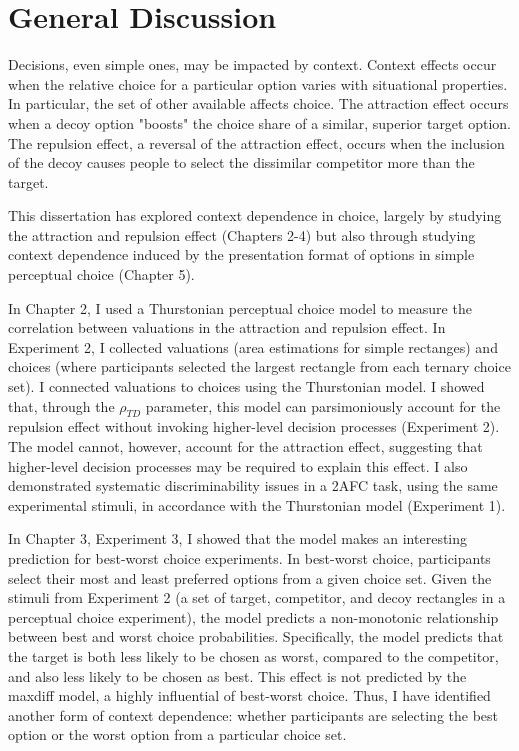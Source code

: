 \section{General Discussion}

Decisions, even simple ones, may be impacted by context. Context effects occur when the relative choice for a particular option varies with situational properties. In particular, the set of other available affects choice. The attraction effect occurs when a decoy option "boosts" the choice share of a similar, superior target option. The repulsion effect, a reversal of the attraction effect, occurs when the inclusion of the decoy causes people to select the dissimilar competitor more than the target. 

This dissertation has explored context dependence in choice, largely by studying the attraction and repulsion effect (Chapters 2-4) but also through studying context dependence induced by the presentation format of options in simple perceptual choice (Chapter 5).

In Chapter 2, I used a Thurstonian perceptual choice model to measure the correlation between valuations in the attraction and repulsion effect. In Experiment 2, I collected valuations (area estimations for simple rectanges) and choices (where participants selected the largest rectangle from each ternary choice set). I connected valuations to choices using the Thurstonian model. I showed that, through the $\rho_{TD}$ parameter, this model can parsimoniously account for the repulsion effect without invoking higher-level decision processes (Experiment 2). The model cannot, however, account for the attraction effect, suggesting that higher-level decision processes may be required to explain this effect. I also demonstrated systematic discriminability issues in a 2AFC task, using the same experimental stimuli, in accordance with the Thurstonian model (Experiment 1).

In Chapter 3, Experiment 3, I showed that the model makes an interesting prediction for best-worst choice experiments. In best-worst choice, participants select their most and least preferred options from a given choice set. Given the stimuli from Experiment 2 (a set of target, competitor, and decoy rectangles in a perceptual choice experiment), the model predicts a non-monotonic relationship between best and worst choice probabilities. Specifically, the model predicts that the target is both less likely to be chosen as worst, compared to the competitor, and also less likely to be chosen as best. This effect is not predicted by the maxdiff model, a highly influential of best-worst choice. Thus, I have identified another form of context dependence: whether participants are selecting the best option or the worst option from a particular choice set.

